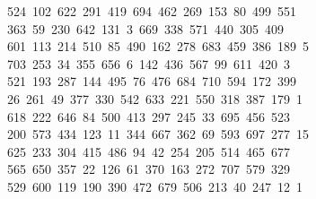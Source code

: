 \begin{tabbing}
\>\ 524\ 102\ 622\ 291\ 419\ 694\ 462\ 269\ 153\ 80\ 499\ 551\ \\[0pt]
\ 363\ 59\ 230\ 642\ 131\ 3\ 669\ 338\ 571\ 440\ 305\ 409\\[0pt]
\>\ 601\ 113\ 214\ 510\ 85\ 490\ 162\ 278\ 683\ 459\ 386\ 189\ 5\\[0pt]
\ 703\ 253\ 34\ 355\ 656\ 6\ 142\ 436\ 567\ 99\ 611\ 420\ 3\\[0pt]
\ 521\ 193\ 287\ 144\ 495\ 76\ 476\ 684\ 710\ 594\ 172\ 399\\[0pt]
\>\ 26\ 261\ 49\ 377\ 330\ 542\ 633\ 221\ 550\ 318\ 387\ 179\ 1\\[0pt]
\ 618\ 222\ 646\ 84\ 500\ 413\ 297\ 245\ 33\ 695\ 456\ 523\\[0pt]
\>\ 200\ 573\ 434\ 123\ 11\ 344\ 667\ 362\ 69\ 593\ 697\ 277\ 15\\[0pt]
\ 625\ 233\ 304\ 415\ 486\ 94\ 42\ 254\ 205\ 514\ 465\ 677\ \\[0pt]
\ 565\ 650\ 357\ 22\ 126\ 61\ 370\ 163\ 272\ 707\ 579\ 329\\[0pt]
\>\ 529\ 600\ 119\ 190\ 390\ 472\ 679\ 506\ 213\ 40\ 247\ 12\ 1\\[0pt]

\end{tabbing}
